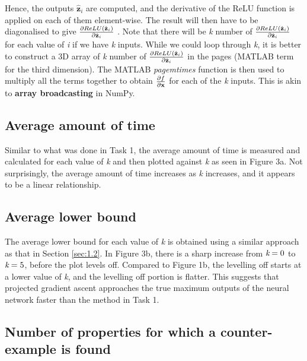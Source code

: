 \documentclass[11pt]{article}
\begin{document}
Hence, the outputs $\hat{ \textbf{z}}_{i}$ are computed, and the derivative of the ReLU function is applied on each of them element-wise. The result will then have to be diagonalised to give ${\pdv{ReLU(\hat{ \textbf{z}}_{i})}{\hat{\textbf{z}}_{i}}}$ \cite{Stanford}. Note that there will be \emph{k} number of ${\pdv{ReLU(\hat{ \textbf{z}}_{i})}{\hat{\textbf{z}}_{i}}}$ for each value of \emph{i} if we have \emph{k} inputs. While we could loop through \emph{k}, it is better to construct a 3D array of \emph{k} number of ${\pdv{ReLU(\hat{ \textbf{z}}_{i})}{\hat{\textbf{z}}_{i}}}$ in the pages (MATLAB term for the third dimension). The MATLAB \emph{pagemtimes} function is then used to multiply all the terms together to obtain $\pdv{f}{\textbf{x}}$ for each of the \emph{k} inputs. This is akin to \textbf{array broadcasting} in NumPy.


\subsection{Average amount of time}

Similar to what was done in Task 1, the average amount of time is measured and calculated for each value of \emph{k} and then plotted against \emph{k} as seen in Figure 3a. Not surprisingly, the average amount of time increases as \emph{k} increases, and it appears to be a linear relationship.

\subsection{Average lower bound}

The average lower bound for each value of \emph{k} is obtained using a similar approach as that in Section \ref{sec:1.2}. In Figure 3b, there is a sharp increase from $\emph{k}=0$ to $\emph{k}=5$, before the plot levels off. Compared to Figure 1b, the levelling off starts at a lower value of \emph{k}, and the levelling off portion is flatter. This suggests that projected gradient ascent approaches the true maximum outputs of the neural network faster than the method in Task 1.

\subsection{Number of properties for which a counter-example is found}
\end{document}
